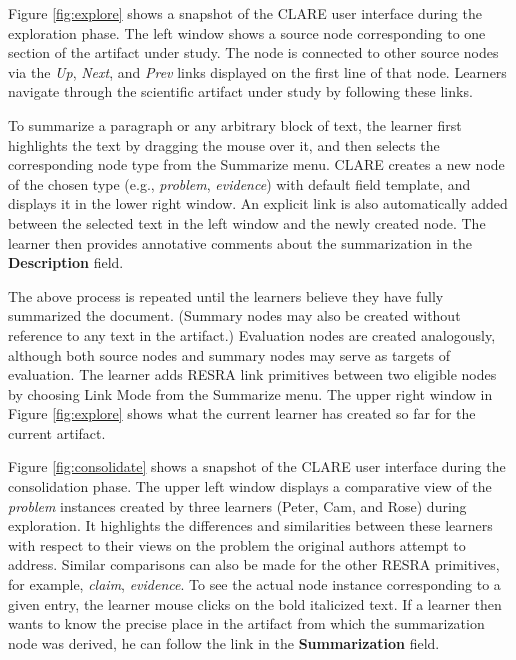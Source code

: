 Figure \ref{fig:explore} shows a snapshot of the CLARE user interface
during the exploration phase. The left window shows a source node
corresponding to one section of the artifact under study.  The node is
connected to other source nodes via the {\it Up\/}, {\it Next\/}, and {\it
Prev\/} links displayed on the first line of that node.  Learners navigate
through the scientific artifact under study by following these links.

To summarize a paragraph or any arbitrary block of text, the learner first
highlights the text by dragging the mouse over it, and then selects the
corresponding node type from the {\sf Summarize\/} menu. CLARE creates a
new node of the chosen type (e.g., {\em problem}, {\em evidence}) with
default field template, and displays it in the lower right window. An
explicit link is also automatically added between the selected text in the
left window and the newly created node. The learner then provides
annotative comments about the summarization in the {\bf Description} field.

The above process is repeated until the learners believe they have fully
summarized the document. (Summary nodes may also be created without
reference to any text in the artifact.)  Evaluation nodes are created
analogously, although both source nodes and summary nodes may serve as
targets of evaluation.  The learner adds RESRA link primitives between two
eligible nodes by choosing {\sf Link Mode\/} from the {\sf Summarize\/}
menu. The upper right window in Figure \ref{fig:explore} shows what the
current learner has created so far for the current artifact.

\begin{figure*}[htb]
  \centerline{}
  \label{fig:explore}
\end{figure*}

Figure \ref{fig:consolidate} shows a snapshot of the CLARE user interface
during the consolidation phase. The upper left window displays a
comparative view of the {\em problem\/} instances created by three learners
(Peter, Cam, and Rose) during exploration. It highlights the differences
and similarities between these learners with respect to their views on the
problem the original authors attempt to address. Similar comparisons can
also be made for the other RESRA primitives, for example, {\it claim}, {\it
evidence}.  To see the actual node instance corresponding to a given entry,
the learner mouse clicks on the bold italicized text.  If a learner then
wants to know the precise place in the artifact from which the
summarization node was derived, he can follow the link in the {\bf
Summarization} field.

